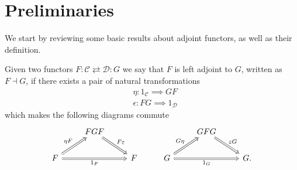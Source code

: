 \section{Preliminaries} %
\label{sec:Preliminaries}
We start by reviewing some basic results about adjoint functors, as well as their definition.
\begin{definition}
  Given two functors $ F:\mathcal{C} \rightleftarrows \mathcal{D}:G $ we say that $ F $ is left adjoint to $ G $, written as $ F \dashv G $, if there exists a pair of natural transformations
  \begin{align*}
    &\eta: 1_\mathcal{C} \implies GF \\
    &\epsilon: FG \implies 1_{\mathcal{D}}
  \end{align*}
  which makes the following diagrams commute
\[\begin{tikzcd}
	& FGF &&& GFG \\
	F && F & G && G.
	\arrow["{1_F}"', from=2-1, to=2-3, Rightarrow]
	\arrow["{\eta F}", from=2-1, to=1-2, Rightarrow]
	\arrow["F\varepsilon", from=1-2, to=2-3, Rightarrow]
	\arrow["{1_G}"', from=2-4, to=2-6, Rightarrow]
	\arrow["G\eta", from=2-4, to=1-5, Rightarrow]
	\arrow["{\varepsilon G}", from=1-5, to=2-6, Rightarrow]
\end{tikzcd}\]
\end{definition}

